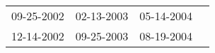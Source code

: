 \begin{supertabular}{llll}
 09-25-2002 &  02-13-2003 &  05-14-2004 \\
 12-14-2002 &  09-25-2003 &  08-19-2004 \\
\end{supertabular}

